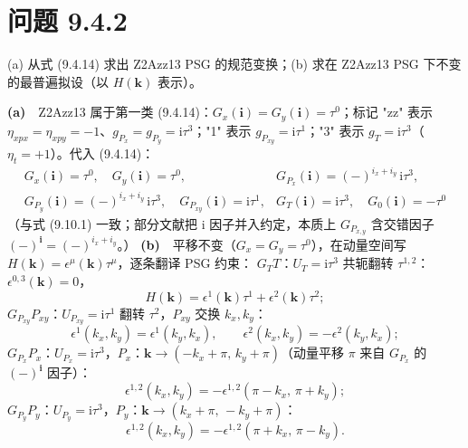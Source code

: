 \section*{问题 9.4.2}
\begin{problem}
(a) 从式 (9.4.14) 求出 Z2Azz13 PSG 的规范变换；(b) 求在 Z2Azz13 PSG 下不变的最普遍拟设（以 $H(\pmb{k})$ 表示）。
\end{problem}
\solution
\textbf{(a)}　Z2Azz13 属于第一类 (9.4.14)：$G_x(\pmb{i})=G_y(\pmb{i})=\tau^0$；标记 "zz" 表示 $\eta_{xpx}=\eta_{xpy}=-1$、$g_{P_x}=g_{P_y}=\mathrm{i}\tau^3$；"1" 表示 $g_{P_{xy}}=\mathrm{i}\tau^1$；"3" 表示 $g_T=\mathrm{i}\tau^3$（$\eta_t=+1$）。代入 (9.4.14)：
\begin{equation*}
\boxed{\;
\begin{array}{ll}
G_x(\pmb{i})=\tau^0,\quad G_y(\pmb{i})=\tau^0, &
G_{P_x}(\pmb{i})=(-)^{i_x+i_y}\,\mathrm{i}\tau^3,\\[2pt]
G_{P_y}(\pmb{i})=(-)^{i_x+i_y}\,\mathrm{i}\tau^3,\quad
G_{P_{xy}}(\pmb{i})=\mathrm{i}\tau^1, &
G_T(\pmb{i})=\mathrm{i}\tau^3,\quad G_0(\pmb{i})=-\tau^0
\end{array}\;}
\end{equation*}
（与式 (9.10.1) 一致；部分文献把 $\mathrm{i}$ 因子并入约定，本质上 $G_{P_{x,y}}$ 含交错因子 $(-)^{\pmb{i}}=(-)^{i_x+i_y}$。）
\textbf{(b)}　平移不变（$G_x=G_y=\tau^0$），在动量空间写 $H(\pmb{k})=\epsilon^{\mu}(\pmb{k})\tau^{\mu}$，逐条翻译 PSG 约束：
\emph{$G_TT$}：$U_T=\mathrm{i}\tau^3$ 共轭翻转 $\tau^{1,2}$：$\epsilon^{0,3}(\pmb{k})=0$，
\begin{equation*}
H(\pmb{k})=\epsilon^{1}(\pmb{k})\tau^{1}+\epsilon^{2}(\pmb{k})\tau^{2} ;
\end{equation*}
\emph{$G_{P_{xy}}P_{xy}$}：$U_{P_{xy}}=\mathrm{i}\tau^1$ 翻转 $\tau^{2}$，$P_{xy}$ 交换 $k_x,k_y$：
\begin{equation*}
\epsilon^{1}(k_x,k_y)=\epsilon^{1}(k_y,k_x),\qquad \epsilon^{2}(k_x,k_y)=-\epsilon^{2}(k_y,k_x) ;
\end{equation*}
\emph{$G_{P_x}P_x$}：$U_{P_x}=\mathrm{i}\tau^3$，$P_x$：$\pmb{k}\to(-k_x+\pi,\,k_y+\pi)$（动量平移 $\pi$ 来自 $G_{P_x}$ 的 $(-)^{\pmb{i}}$ 因子）：
\begin{equation*}
\epsilon^{1,2}(k_x,k_y)=-\epsilon^{1,2}(\pi-k_x,\,\pi+k_y) ;
\end{equation*}
\emph{$G_{P_y}P_y$}：$U_{P_y}=\mathrm{i}\tau^3$，$P_y$：$\pmb{k}\to(k_x+\pi,\,-k_y+\pi)$：
\begin{equation*}
\epsilon^{1,2}(k_x,k_y)=-\epsilon^{1,2}(\pi+k_x,\,\pi-k_y) .
\end{equation*}
